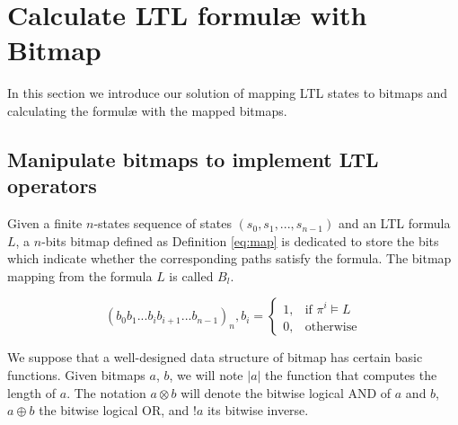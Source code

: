 
\section{Calculate LTL formul\ae{} with Bitmap}\label{sec:bm:ltlbitmap} %

In this section we introduce our solution of mapping LTL states to bitmaps and calculating the formul\ae{} with the mapped bitmaps.

\subsection{Manipulate bitmaps to implement LTL operators} %

Given a finite $n$-states sequence of states $(s_0, s_1, ..., s_{n - 1})$ and an LTL formula $L$, a $n$-bits bitmap defined as Definition \eqref{eq:map} is dedicated to store the bits which indicate whether the corresponding paths satisfy the formula. The bitmap mapping from the formula $L$ is called $B_l$.

\begin{equation}\label{eq:map}
(b_0b_1...b_ib_{i + 1}...b_{n - 1})_n, b_i = \begin{cases}
1, & \text{if $\pi^i \vDash L$} \\
0, & \text{otherwise}
\end{cases}
\end{equation}

We suppose that a well-designed data structure of bitmap has certain basic functions. Given bitmaps $a$, $b$, we will note $|a|$ the function that computes the length of $a$. The notation $a \otimes b$ will denote the bitwise logical AND of $a$ and $b$, $a \oplus b$ the bitwise logical OR, and $!a$ its bitwise inverse. %


